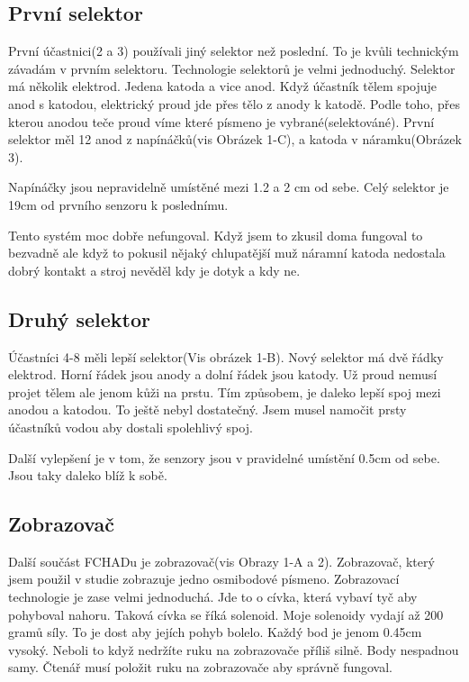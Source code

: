 \subsection{První selektor}

První účastnici(2 a 3) používali jiný selektor než poslední.  To je kvůli technickým závadám v prvním selektoru.   Technologie selektorů je velmi jednoduchý.  Selektor má několik elektrod. Jedena katoda a vice anod. Když účastník tělem spojuje anod s katodou, elektrický proud jde přes tělo z anody k katodě. Podle toho, přes kterou anodou teče proud víme které písmeno je vybrané(selektováné).   První selektor měl 12 anod z napínáčků(vis Obrázek 1-C), a katoda v náramku(Obrázek 3).

Napínáčky jsou nepravidelně umístěné mezi 1.2 a 2 cm od sebe.  Celý selektor je 19cm od prvního senzoru k poslednímu.

Tento systém moc dobře nefungoval. Když jsem to zkusil doma fungoval to bezvadně ale když to pokusil nějaký chlupatější muž náramní katoda nedostala dobrý kontakt a stroj nevěděl kdy je dotyk a kdy ne.

\subsection{Druhý selektor}

Účastníci 4-8 měli lepší selektor(Vis obrázek 1-B). Nový selektor má dvě řádky elektrod. Horní řádek jsou anody a dolní řádek jsou katody.  Už proud nemusí projet tělem ale jenom kůži na prstu.  Tím způsobem, je daleko lepší spoj mezi anodou a katodou.  To ještě nebyl dostatečný.  Jsem musel namočit prsty účastníků vodou aby dostali spolehlivý spoj.

Další vylepšení je v tom, že senzory jsou v pravidelné umístění 0.5cm od sebe.  Jsou taky daleko blíž k sobě.

\subsection{Zobrazovač}
Další součást FCHADu je zobrazovač(vis Obrazy 1-A a 2).  Zobrazovač, který jsem použil v studie zobrazuje jedno osmibodové písmeno.  Zobrazovací technologie je zase velmi jednoduchá.  Jde to o cívka, která vybaví tyč aby pohyboval nahoru.  Taková cívka se říká solenoid.  Moje solenoidy vydají až 200 gramů síly\citep{multicomp}.  To je dost aby jejích pohyb bolelo.  Každý bod je jenom 0.45cm vysoký. Neboli to když nedržíte ruku na zobrazovače příliš silně.  Body nespadnou samy.  Čtenář musí položit ruku na zobrazovače aby správně fungoval.

